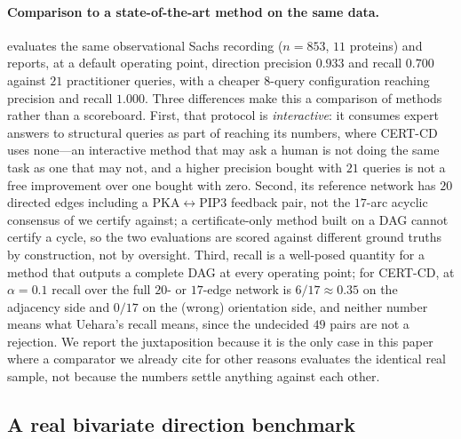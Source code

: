 \documentclass[pdflatex,sn-apa]{sn-jnl}
\theoremstyle{thmstyleone}%
\theoremstyle{thmstyletwo}%
\theoremstyle{thmstylethree}%
\begin{document}
\paragraph{Comparison to a state-of-the-art method on the same data.} \citet{uehara2026iterative}
evaluates the same observational Sachs recording ($n=853$, $11$ proteins) and
reports, at a default operating point, direction precision $0.933$ and recall
$0.700$ against $21$ practitioner queries, with a cheaper $8$-query
configuration reaching precision and recall $1.000$. Three differences make
this a comparison of methods rather than a scoreboard. First, that protocol
is \emph{interactive}: it consumes expert answers to structural queries as
part of reaching its numbers, where CERT-CD uses none---an interactive method
that may ask a human is not doing the same task as one that may not, and a
higher precision bought with $21$ queries is not a free improvement over one
bought with zero. Second, its reference network has $20$ directed edges
including a PKA$\leftrightarrow$PIP3 feedback pair, not the $17$-arc acyclic
consensus of \citet{sachs2005causal} we certify against; a certificate-only
method built on a DAG cannot certify a cycle, so the two evaluations are
scored against different ground truths by construction, not by oversight.
Third, recall is a well-posed quantity for a method that outputs a complete
DAG at every operating point; for CERT-CD, at $\alpha=0.1$ recall over the
full $20$- or $17$-edge network is $6/17 \approx 0.35$ on the adjacency side
and $0/17$ on the (wrong) orientation side, and neither number means what
Uehara's recall means, since the undecided $49$ pairs are not a rejection.
We report the juxtaposition because it is the only case in this paper where a
comparator we already cite for other reasons evaluates the identical real
sample, not because the numbers settle anything against each other.

\subsection{A real bivariate direction benchmark}\label{sec:exp-tuebingen}
\end{document}
